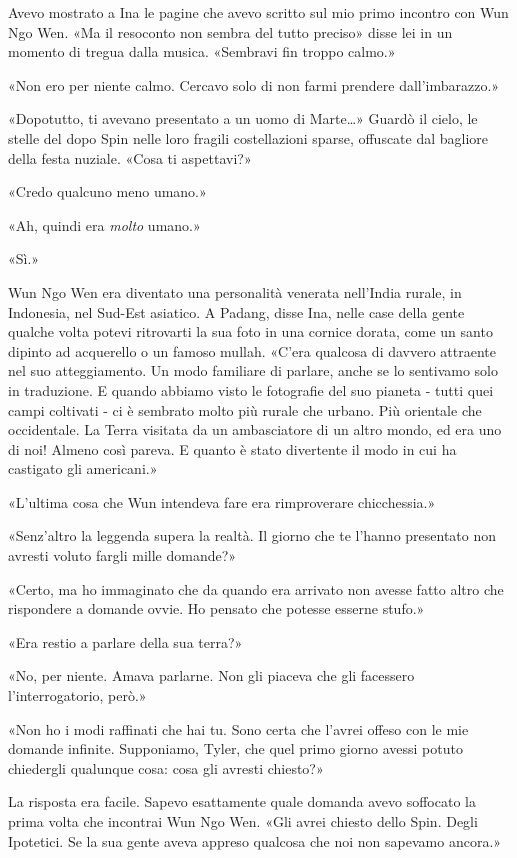 Avevo mostrato a Ina le pagine che avevo scritto sul mio primo incontro
con Wun Ngo Wen. «Ma il resoconto non sembra del tutto preciso» disse
lei in un momento di tregua dalla musica. «Sembravi fin troppo calmo.»

«Non ero per niente calmo. Cercavo solo di non farmi prendere
dall'imbarazzo.»

«Dopotutto, ti avevano presentato a un uomo di Marte\ldots» Guardò il
cielo, le stelle del dopo Spin nelle loro fragili costellazioni sparse,
offuscate dal bagliore della festa nuziale. «Cosa ti aspettavi?»

«Credo qualcuno meno umano.»

«Ah, quindi era \emph{molto} umano.»

«Sì.»

Wun Ngo Wen era diventato una personalità venerata nell'India rurale, in
Indonesia, nel Sud-Est asiatico. A Padang, disse Ina, nelle case della
gente qualche volta potevi ritrovarti la sua foto in una cornice dorata,
come un santo dipinto ad acquerello o un famoso mullah. «C'era qualcosa
di davvero attraente nel suo atteggiamento. Un modo familiare di
parlare, anche se lo sentivamo solo in traduzione. E quando abbiamo
visto le fotografie del suo pianeta - tutti quei campi coltivati - ci è
sembrato molto più rurale che urbano. Più orientale che occidentale. La
Terra visitata da un ambasciatore di un altro mondo, ed era uno di noi!
Almeno così pareva. E quanto è stato divertente il modo in cui ha
castigato gli americani.»

«L'ultima cosa che Wun intendeva fare era rimproverare chicchessia.»

«Senz'altro la leggenda supera la realtà. Il giorno che te l'hanno
presentato non avresti voluto fargli mille domande?»

«Certo, ma ho immaginato che da quando era arrivato non avesse fatto
altro che rispondere a domande ovvie. Ho pensato che potesse esserne
stufo.»

«Era restio a parlare della sua terra?»

«No, per niente. Amava parlarne. Non gli piaceva che gli facessero
l'interrogatorio, però.»

«Non ho i modi raffinati che hai tu. Sono certa che l'avrei offeso con
le mie domande infinite. Supponiamo, Tyler, che quel primo giorno avessi
potuto chiedergli qualunque cosa: cosa gli avresti chiesto?»

La risposta era facile. Sapevo esattamente quale domanda avevo soffocato
la prima volta che incontrai Wun Ngo Wen. «Gli avrei chiesto dello Spin.
Degli Ipotetici. Se la sua gente aveva appreso qualcosa che noi non
sapevamo ancora.»

